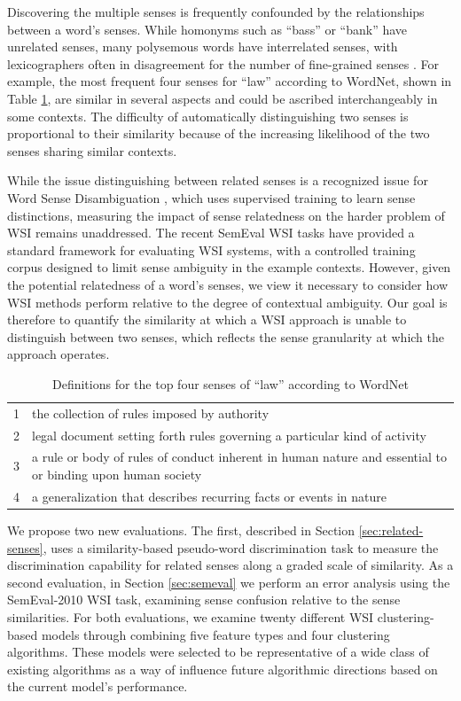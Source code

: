 \documentclass[11pt]{article}
\begin{document}
Discovering the multiple senses is frequently confounded by the relationships
between a word's senses.  While homonyms such as ``bass'' or ``bank'' have
unrelated senses, many polysemous words have interrelated senses, with
lexicographers often in disagreement for the number of fine-grained senses
\cite{palmer07making}.  For example, the most frequent four senses for ``law''
according to WordNet, shown in Table \ref{tab:law-senses}, are similar in
several aspects and could be ascribed interchangeably in some contexts.
%
The difficulty of automatically distinguishing two senses is proportional to
their similarity because of the increasing likelihood of the two senses sharing
similar contexts.


While the issue distinguishing between related senses is a recognized issue 
for Word Sense Disambiguation \cite{chugur02polysemy,mccarthy06relating}, which
uses supervised training to learn sense distinctions, measuring the impact of
sense relatedness on the harder problem of WSI remains unaddressed.
%
The recent SemEval WSI tasks \cite{agirre07semeval,manandhar09semeval} have
provided a standard framework for evaluating WSI systems, with a controlled
training corpus designed to limit sense ambiguity in the example contexts.
However, given the potential relatedness of a word's senses, we view it
necessary to consider how WSI methods perform relative to the degree of
contextual ambiguity.
%
Our goal is therefore to quantify the similarity at which a WSI approach is
unable to distinguish between two senses, which reflects the sense granularity
at which the approach operates.

\begin{table}
  \footnotesize
  \begin{tabular}{l p{70mm}}
    \toprule
    1 & the collection of rules imposed by authority \\
    2 & legal document setting forth rules governing a particular kind of activity \\
    3 & a rule or body of rules of conduct inherent in human nature and essential to or binding upon human society \\
    4 & a generalization that describes recurring facts or events in nature \\
    \bottomrule
  \end{tabular}
  \caption{Definitions for the top four senses of ``law'' according to WordNet}
  \label{tab:law-senses}
\end{table}

We propose two new evaluations.  The first, described in Section
\ref{sec:related-senses}, uses a similarity-based pseudo-word discrimination
task to measure the discrimination capability for related senses along a graded
scale of similarity.  As a second evaluation, in Section \ref{sec:semeval} we
perform an error analysis using the SemEval-2010 WSI task, examining sense
confusion relative to the sense similarities.  For both evaluations, we examine
twenty different WSI clustering-based models through combining five feature
types and four clustering algorithms.  These models were selected to be
representative of a wide class of existing algorithms as a way of influence
future algorithmic directions based on the current model's performance.
\end{document}
